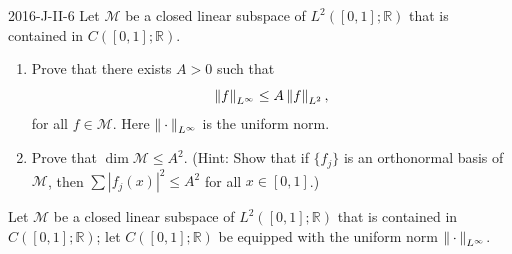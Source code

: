 \documentclass{article}
\begin{document}
	\begin{prb}{2016-J-II-6}
		Let $\mathcal{M}$ be a closed linear subspace of $L^{2}([0,1];\mathbb{R})$ that is contained in $C([0,1];\mathbb{R})$. \vspace{-0.25cm}
		\begin{enumerate}[itemsep =-2pt,label = (\alph{*})]
			\item Prove that there exists $A > 0$ such that 
				\begin{equation*}
					\left\Vert f \right\Vert_{L^\infty} \leq A \left\Vert f \right\Vert_{L^2}, 
				\end{equation*}
			for all $f \in \mathcal{M}$. Here $\left\Vert \hspace{2pt}\cdot\hspace{2pt} \right\Vert_{L^\infty}$ is the uniform norm. 
			\item Prove that $\dim{\mathcal{M}} \leq A^2$. (Hint: Show that if $\{f_j\}$ is an orthonormal basis of $\mathcal{M}$, then $\sum |f_j(x)|^2\leq A^2$ for all $x \in [0,1]$.) 
		\end{enumerate}
	\end{prb}
	Let $\mathcal{M}$ be a closed linear subspace of $L^{2}([0,1]; \mathbb{R})$ that is contained in $C([0,1]; \mathbb{R})$; let $C([0,1]; \mathbb{R})$ be equipped with the uniform norm $\left\Vert \hspace{2pt}\cdot\hspace{2pt} \right\Vert_{L^{\infty}}$. \vspace{-0.25cm}
\end{document}
